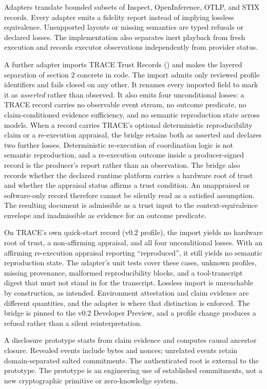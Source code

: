 \documentclass[
  american,
  10pt,
  a4paper,
]{article}
\begin{document}
Adapters translate bounded subsets of Inspect, OpenInference, OTLP, and
STIX records. Every adapter emits a fidelity report instead of implying
lossless equivalence. Unsupported layouts or missing semantics are typed
refusals or declared losses. The implementation also separates inert
playback from fresh execution and records executor observations
independently from provider status.

A further adapter imports TRACE Trust Records
() and makes the layered
separation of section 2 concrete in code. The import admits only
reviewed profile identifiers and fails closed on any other. It renames
every imported field to mark it as \emph{asserted} rather than observed.
It also emits four unconditional losses: a TRACE record carries no
observable event stream, no outcome predicate, no claim-conditioned
evidence sufficiency, and no semantic reproduction state across models.
When a record carries TRACE's optional deterministic reproducibility
claim or a re-execution appraisal, the bridge retains both as asserted
and declares two further losses. Deterministic re-execution of
coordination logic is not semantic reproduction, and a re-execution
outcome inside a producer-signed record is the producer's report rather
than an observation. The bridge also records whether the declared
runtime platform carries a hardware root of trust and whether the
appraisal status affirms a trust condition. An unappraised or
software-only record therefore cannot be silently read as a satisfied
assumption. The resulting document is admissible as a trust input to the
context-equivalence envelope and inadmissible as evidence for an outcome
predicate.

On TRACE's own quick-start record (v0.2 profile), the import yields no
hardware root of trust, a non-affirming appraisal, and all four
unconditional losses. With an affirming re-execution appraisal reporting
``reproduced'', it still yields no semantic reproduction state. The
adapter's unit tests cover these cases, unknown profiles, missing
provenance, malformed reproducibility blocks, and a tool-transcript
digest that must not stand in for the transcript. Lossless import is
unreachable by construction, as intended. Environment attestation and
claim evidence are different quantities, and the adapter is where that
distinction is enforced. The bridge is pinned to the v0.2 Developer
Preview, and a profile change produces a refusal rather than a silent
reinterpretation.

A disclosure prototype starts from claim evidence and computes causal
ancestor closure. Revealed events include bytes and nonces; unrelated
events retain domain-separated salted commitments. The authenticated
root is external to the prototype. The prototype is an engineering use
of established commitments, not a new cryptographic primitive or
zero-knowledge system.
\end{document}
